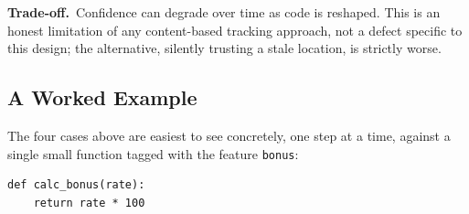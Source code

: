 \documentclass[11pt]{article}
\newcommand{\tradeoff}{\noindent\textbf{Trade-off.}\ }
\begin{document}
\tradeoff Confidence can degrade over time as code is reshaped. This is
an honest limitation of any content-based tracking approach, not a defect
specific to this design; the alternative, silently trusting a stale
location, is strictly worse.

\subsection{A Worked Example}
\label{sec:resolution-example}

The four cases above are easiest to see concretely, one step at a time,
against a single small function tagged with the feature \texttt{bonus}:

\begin{verbatim}
def calc_bonus(rate):
    return rate * 100
\end{verbatim}
\end{document}
